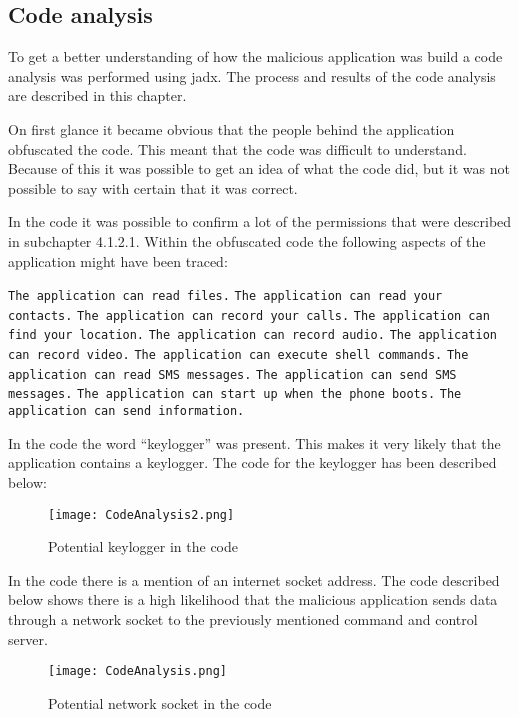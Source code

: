 \subsection{Code analysis}
To get a better understanding of how the malicious application was build a code analysis was performed using jadx. The process and results of the code analysis are described in this chapter.

On first glance it became obvious that the people behind the application obfuscated the code. This meant that the code was difficult to understand. Because of this it was possible to get an idea of what the code did, but it was not possible to say with certain that it was correct.

In the code it was possible to confirm a lot of the permissions that were described in subchapter 4.1.2.1. Within the obfuscated code the following aspects of the application might have been traced:

\texttt{The application can read files.}
\newline \texttt{The application can read your contacts.}
\newline \texttt{The application can record your calls.}
\newline \texttt{The application can find your location.}
\newline \texttt{The application can record audio.}
\newline \texttt{The application can record video.}
\newline \texttt{The application can execute shell commands.}
\newline \texttt{The application can read SMS messages.}
\newline \texttt{The application can send SMS messages.}
\newline \texttt{The application can start up when the phone boots.}
\newline \texttt{The application can send information.}

In the code the word “keylogger” was present. This makes it very likely that the application contains a keylogger. The code for the keylogger has been described below:

\begin{figure}[H]
    \centering
    \texttt{[image: CodeAnalysis2.png]}
    \caption{Potential keylogger in the code}
    \label{jordy-keylogger}
\end{figure}

In the code there is a mention of an internet socket address. The code described below shows there is a high likelihood that the malicious application sends data through a network socket to the previously mentioned command and control server. 

\begin{figure}[H]
    \centering
    \texttt{[image: CodeAnalysis.png]}
    \caption{Potential network socket in the code}
    \label{jordy-networksocket}
\end{figure}